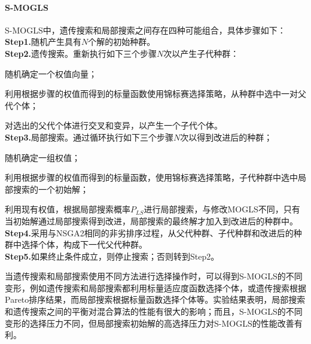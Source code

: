            \paragraph{S-MOGLS}
            S-MOGLS中，遗传搜索和局部搜索之间存在四种可能组合，具体步骤如下：\\
            \textbf{Step1.}随机产生具有$N$个解的初始种群。\\
            \textbf{Step2.}遗传搜索。重新执行如下三个步骤$N$次以产生子代种群：
            \par
            随机确定一个权值向量；
            \par
            利用根据步骤的权值而得到的标量函数使用锦标赛选择策略，从种群中选中一对父代个体；
            \par
            对选出的父代个体进行交叉和变异，以产生一个子代个体。\\
            \textbf{Step3.}局部搜索。通过循环执行如下三个步骤$N$次以得到改进后的种群；
            \par
            随机确定一组权值；
            \par
            利用根据步骤的权值而得到的标量函数，使用锦标赛选择策略，子代种群中选中局部搜索的一个初始解；
            \par
            利用现有权值，根据局部搜索概率$P_{LS}$进行局部搜索，与修改MOGLS不同，只有当初始解通过局部搜索得到改进，局部搜索的最终解才加入到改进后的种群中。\\
            \textbf{Step4.}采用与NSGA2相同的非劣排序过程，从父代种群、子代种群和改进后的种群中选择个体，构成下一代父代种群。\\
            \textbf{Step5.}如果终止条件成立，则停止搜索；否则转到Step2。
            \par
            当遗传搜索和局部搜索使用不同方法进行选择操作时，可以得到S-MOGLS的不同变形，例如遗传搜索和局部搜索都利用标量适应度函数选择个体，或遗传搜索根据Pareto排序结果，而局部搜索根据标量函数选择个体等。实验结果表明，局部搜索和遗传搜索之间的平衡对混合算法的性能有很大的影响；而且，S-MOGLS的不同变形的选择压力不同，但局部搜索初始解的高选择压力对S-MOGLS的性能改善有利。
